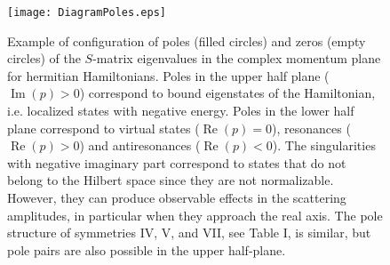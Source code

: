 \begin{figure}[h]
    \texttt{[image: DiagramPoles.eps]}
    \caption{Example of configuration of  poles (filled circles) and zeros (empty circles) of the $S$-matrix eigenvalues in the complex momentum plane for hermitian Hamiltonians.  Poles in the upper half plane ($\operatorname{Im}(p) > 0$) correspond to bound eigenstates of the Hamiltonian, i.e. localized states with negative energy. Poles in the lower half plane correspond to  virtual states ($\operatorname{Re}(p) = 0$), resonances ($\operatorname{Re}(p) > 0$) and antiresonances ($\operatorname{Re}(p)<0$). The singularities with negative imaginary part correspond to states that do not belong to the Hilbert space since they are not normalizable. However, they can produce observable effects in the scattering amplitudes, in particular when they approach the real axis. The pole structure of symmetries IV, V, and VII, see Table I,
is similar, but pole pairs are also possible in the upper half-plane.}
    \label{fig:DiagramPoles}
\end{figure}





